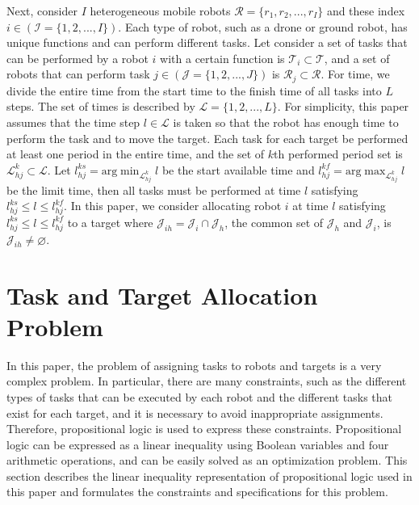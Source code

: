 \documentclass[]{interact}
\theoremstyle{plain}%
\theoremstyle{definition}
\theoremstyle{remark}
\begin{document}
Next, consider $I$ heterogeneous mobile robots $\mathcal{R}=\{r_1,r_2,...,r_I\}$ and these index $i\in(\mathcal{I}=\{1,2,...,I\})$.
Each type of robot, such as a drone or ground robot, has unique functions and can perform different tasks.
Let consider a set of tasks that can be performed by a robot $i$ with a certain function is $\mathcal{T}_i\subset\mathcal{T}$, and a set of robots that can perform task $j\in(\mathcal{J} = \{1,2,...,J\})$ is $\mathcal{R}_j\subset\mathcal{R}$. 
For time, we divide the entire time from the start time to the finish time of all tasks into $L$ steps. 
The set of times is described by $\mathcal{L}=\{1,2,...,L\}$.
For simplicity, this paper assumes that the time step $l\in\mathcal{L}$ is taken so that the robot has enough time to perform the task and to move the target.
Each task for each target be performed at least one period in the entire time, and the set of $k$th performed period set is $\mathcal{L}^k_{hj}\subset\mathcal{L}$. 
Let $l^{ks}_{hj} = \mathrm{arg}\min_{\mathcal{L}^k_{hj}} l$ be the start available time and $l^{kf}_{hj} = \mathrm{arg}\max_{\mathcal{L}^k_{hj}} l$ be the limit time, then all tasks must be performed at time $l$ satisfying $l^{ks}_{hj} \le l \le l^{kf}_{hj}$.
In this paper, we consider allocating robot $i$ at time $l$ satisfying $l^{ks}_{hj} \le l \le l^{kf}_{hj}$ to a target where $\mathcal{J}_{ih}=\mathcal{J}_{i}\cap\mathcal{J}_{h}$, the common set of $\mathcal{J}_h$ and $\mathcal{J}_i$, is $\mathcal{J}_{ih}\neq \varnothing$.

\section{Task and Target Allocation Problem}
In this paper, the problem of assigning tasks to robots and targets is a very complex problem. 
In particular, there are many constraints, such as the different types of tasks that can be executed by each robot and the different tasks that exist for each target, and it is necessary to avoid inappropriate assignments.
Therefore, propositional logic is used to express these constraints. 
Propositional logic can be expressed as a linear inequality using Boolean variables and four arithmetic operations, and can be easily solved as an optimization problem. 
This section describes the linear inequality representation of propositional logic used in this paper and formulates the constraints and specifications for this problem.
\end{document}
